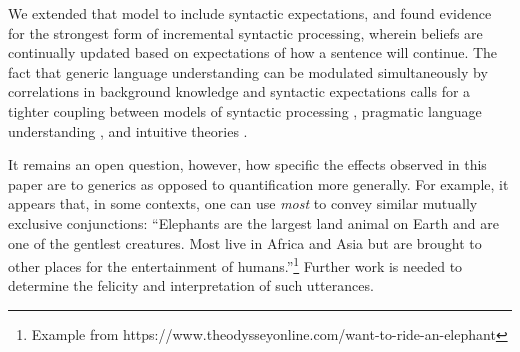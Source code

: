 \documentclass[10pt,letterpaper]{article}
\begin{document}
We extended that model to include syntactic expectations, and found evidence for the strongest form of incremental syntactic processing, wherein beliefs are continually updated based on expectations of how a sentence will continue. 
The fact that generic language understanding can be modulated simultaneously by correlations in background knowledge and syntactic expectations calls for a tighter coupling between models of syntactic processing \cite{Levy2008}, pragmatic language understanding \cite{Goodman2016}, and intuitive theories \cite{tenenbaum2011grow}. 

It remains an open question, however, how specific the effects observed in this paper are to generics as opposed to quantification more generally. 
For example, it appears that, in some contexts, one can use \emph{most} to convey similar mutually exclusive conjunctions: ``Elephants are the largest land animal on Earth and are one of the gentlest creatures. Most live in Africa and Asia but are brought to other places for the entertainment of humans.''\footnote{
Example from https://www.theodysseyonline.com/want-to-ride-an-elephant
}
Further work is needed to determine the felicity and interpretation of such utterances.





\end{document}
